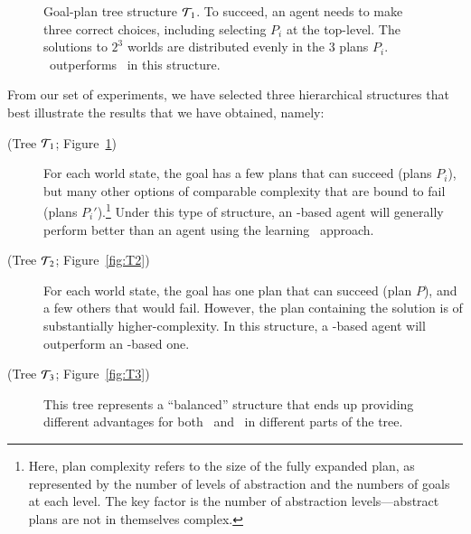 \begin{figure}[t]
\begin{center}

\end{center}
\caption{Goal-plan tree structure ${\mathcal{T}}_1$. To succeed, an agent needs 
to make three correct choices, including selecting  $P_i$ at the
top-level. The solutions to $2^3$ worlds are distributed evenly in the $3$ plans 
$P_i$. \CL\ outperforms \BUL\ in this structure.}
\label{fig:T1}
\end{figure}


From our set of experiments, we have selected three hierarchical structures that
best illustrate the results that we have obtained, namely:
\begin{description}
\item[(Tree ${\mathcal{T}}_1$; Figure~\ref{fig:T1})] For each world state, the
goal has a few plans that can succeed (plans $P_i$), but many other options of comparable
complexity that are bound to fail (plans $P_i'$).\footnote{Here, plan
complexity refers to the size of the fully expanded plan, as represented
by the number of levels of abstraction and the numbers of goals at each level.
The key factor is the number of abstraction levels---abstract plans are not in
themselves complex.}
Under this type of structure, an \CL-based agent will generally perform better 
than an agent using the learning \BUL\ approach.

\item[(Tree ${\mathcal{T}}_2$; Figure~\ref{fig:T2})] For each world state, the goal has
one plan that can succeed (plan $P$), and a few others that would fail.
However, the plan containing the solution is of substantially
higher-complexity.
In this structure, a \BUL-based agent will outperform an \CL-based one.

\item[(Tree ${\mathcal{T}}_3$; Figure~\ref{fig:T3})] This tree represents a ``balanced''
structure that ends up providing different advantages for both \BUL\ and \CL\ in
different parts of the tree.
\end{description}



